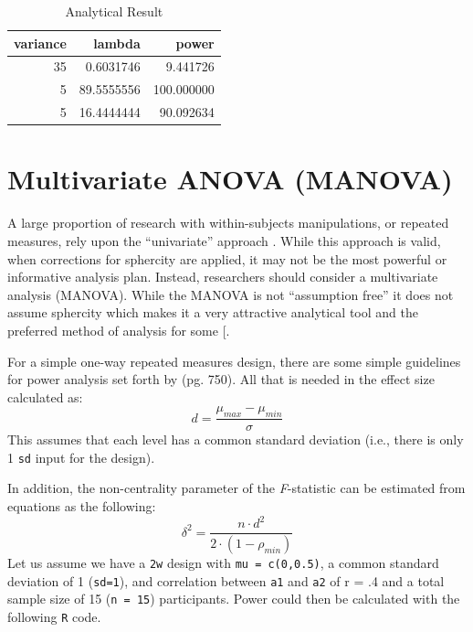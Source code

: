 \documentclass[
]{book}
\begin{document}
\begin{table}[!h]

\caption{\label{tab:unnamed-chunk-124}Analytical Result}
\centering
\begin{tabular}[t]{r|r|r}
\hline
variance & lambda & power\\
\hline
35 & 0.6031746 & 9.441726\\
\hline
5 & 89.5555556 & 100.000000\\
\hline
5 & 16.4444444 & 90.092634\\
\hline
\end{tabular}
\end{table}

\hypertarget{multivariate-anova-manova}{%
\section{Multivariate ANOVA (MANOVA)}\label{multivariate-anova-manova}}

A large proportion of research with within-subjects manipulations, or repeated measures, rely upon the ``univariate'' approach \citep{maxwell_designing_2004}. While this approach is valid, when corrections for sphercity are applied, it may not be the most powerful or informative analysis plan. Instead, researchers should consider a multivariate analysis (MANOVA). While the MANOVA is not ``assumption free'' it does not assume sphercity which makes it a very attractive analytical tool and the preferred method of analysis for some {[}\citet{maxwell_designing_2004}.

For a simple one-way repeated measures design, there are some simple guidelines for power analysis set forth by \citet{maxwell_designing_2004} (pg. 750). All that is needed in the effect size calculated as:
\[ d = \frac{\mu_{max}-\mu_{min}}{\sigma} \]
This assumes that each level has a common standard deviation (i.e., there is only 1 \texttt{sd} input for the design).

In addition, the non-centrality parameter of the \emph{F}-statistic can be estimated from \citet{vonesh1986sample} equations as the following:
\[ \delta^2 = \frac{n \cdot d^2}{2\cdot(1-\rho_{min} )} \]
\newpage
Let us assume we have a \texttt{2w} design with \texttt{mu\ =\ c(0,0.5)}, a common standard deviation of 1 (\texttt{sd=1}), and correlation between \texttt{a1} and \texttt{a2} of r = .4 and a total sample size of 15 (\texttt{n\ =\ 15}) participants.
Power could then be calculated with the following \texttt{R} code.
\end{document}
